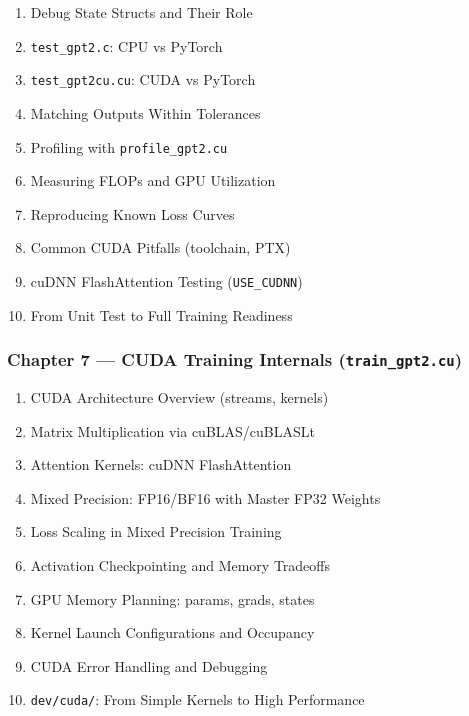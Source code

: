 \documentclass[
  letterpaper,
  DIV=11,
  numbers=noendperiod]{scrreprt}
\providecommand{\tightlist}{%
  \setlength{\itemsep}{0pt}\setlength{\parskip}{0pt}}
\begin{document}
\begin{enumerate}
\def\labelenumi{\arabic{enumi}.}
\setcounter{enumi}{50}
\tightlist
\item
  Debug State Structs and Their Role
\item
  \texttt{test\_gpt2.c}: CPU vs PyTorch
\item
  \texttt{test\_gpt2cu.cu}: CUDA vs PyTorch
\item
  Matching Outputs Within Tolerances
\item
  Profiling with \texttt{profile\_gpt2.cu}
\item
  Measuring FLOPs and GPU Utilization
\item
  Reproducing Known Loss Curves
\item
  Common CUDA Pitfalls (toolchain, PTX)
\item
  cuDNN FlashAttention Testing (\texttt{USE\_CUDNN})
\item
  From Unit Test to Full Training Readiness
\end{enumerate}

\subsubsection{\texorpdfstring{Chapter 7 --- CUDA Training Internals
(\texttt{train\_gpt2.cu})}{Chapter 7 --- CUDA Training Internals (train\_gpt2.cu)}}\label{chapter-7-cuda-training-internals-train_gpt2.cu}

\begin{enumerate}
\def\labelenumi{\arabic{enumi}.}
\setcounter{enumi}{60}
\tightlist
\item
  CUDA Architecture Overview (streams, kernels)
\item
  Matrix Multiplication via cuBLAS/cuBLASLt
\item
  Attention Kernels: cuDNN FlashAttention
\item
  Mixed Precision: FP16/BF16 with Master FP32 Weights
\item
  Loss Scaling in Mixed Precision Training
\item
  Activation Checkpointing and Memory Tradeoffs
\item
  GPU Memory Planning: params, grads, states
\item
  Kernel Launch Configurations and Occupancy
\item
  CUDA Error Handling and Debugging
\item
  \texttt{dev/cuda/}: From Simple Kernels to High Performance
\end{enumerate}
\end{document}
